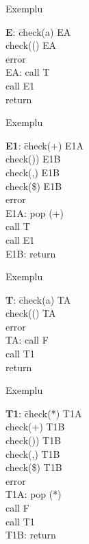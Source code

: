 \documentclass[pdf]{beamer}
\begin{document}
\begin{frame}{Exemplu}
\begin{tabbing}
\textbf{E}: \= check(a) EA \\
    \> check(() EA \\
    \> error \\
EA: call T \\
    \> call E1 \\ 
    \> return \\
\end{tabbing}
\end{frame}



\begin{frame}{Exemplu}

\begin{tabbing}
\textbf{E1}: \= check(+) E1A\\
    \> check()) E1B\\
    \> check(,) E1B\\
    \> check(\$) E1B\\
    \> error\\
E1A: pop (+)\\
     \> call T\\
     \> call E1\\
E1B: return\\
\end{tabbing}
\end{frame}



\begin{frame}{Exemplu}

\begin{tabbing}
\textbf{T}: \= check(a) TA \\
   \> check(() TA\\
   \> error\\
TA: call F\\
    \> call T1\\
    \> return\\
\end{tabbing}
\end{frame}



\begin{frame}{Exemplu}

\begin{tabbing}
\textbf{T1}: \= check(*) T1A\\
    \> check(+) T1B\\
    \> check()) T1B\\
    \> check(,) T1B\\
    \> check(\$) T1B\\
    \> error\\
T1A: pop (*)\\
     \> call F\\
     \> call T1\\
T1B: return\\
\end{tabbing}
\end{frame}
\end{document}
